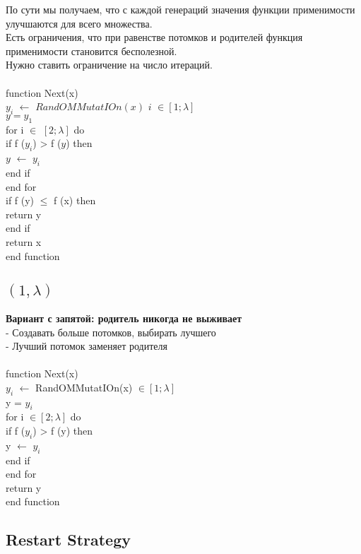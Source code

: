 По сути мы получаем, что с каждой генераций значения функции применимости улучшаются для всего множества. \\
Есть ограничения, что при равенстве потомков и родителей функция применимости становится бесполезной. \\
Нужно ставить ограничение на число итераций.\\
\\
function Next(x)  \\
\tab $y_i$ $\leftarrow$ $RandOMMutatIOn(x)$  $i$ $\in [1;\lambda]$  \\
\tab $y = y_1$   \\
\tab for i $\in$ $[2;\lambda]$ do  \\
\tab \tab if f ($y_i$) > f ($y$) then  \\
\tab \tab \tab $y$ $\leftarrow$ $y_i$   \\
\tab \tab end if \\ 
\tab end for  \\
\tab if f (y) $\le$ f (x) then \\
\tab \tab return y  \\
\tab end if  \\
\tab return x  \\
end function

\subsection*{$(1,\lambda)$}

\textbf{Вариант с запятой: родитель никогда не выживает}\\
- Создавать больше потомков, выбирать лучшего\\ 
- Лучший потомок заменяет родителя \\
\\
function Next(x)  \\
\tab $y_i$ $\leftarrow$ RandOMMutatIOn(x)  $\in [1;\lambda]$  \\
\tab y = $y_i$  \\
\tab for i $\in [2;\lambda]$ do  \\
\tab \tab if f ($y_i$) > f (y) then  \\
\tab \tab \tab y $\leftarrow$ $y_i$   \\
\tab \tab end if  \\
\tab end for  \\
\tab return y  \\
end function

\subsection*{Restart Strategy}

